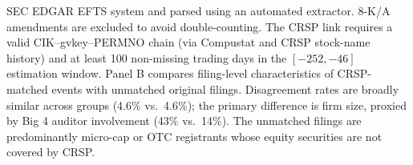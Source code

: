 \begin{table}[htbp]
\begin{minipage}{0.92\textwidth}
SEC EDGAR EFTS system and parsed using an automated extractor. 8-K/A
amendments are excluded to avoid double-counting. The CRSP link requires a
valid CIK--gvkey--PERMNO chain (via Compustat and CRSP stock-name history)
and at least 100 non-missing trading days in the $[-252, -46]$ estimation
window. Panel B compares filing-level characteristics of CRSP-matched events
with unmatched original filings. Disagreement rates are broadly similar
across groups (4.6\% vs.\ 4.6\%); the primary difference is firm size, proxied
by Big 4 auditor involvement (43\% vs.\ 14\%). The unmatched filings are
predominantly micro-cap or OTC registrants whose equity securities are not
covered by CRSP.
\end{minipage}
\end{table}

